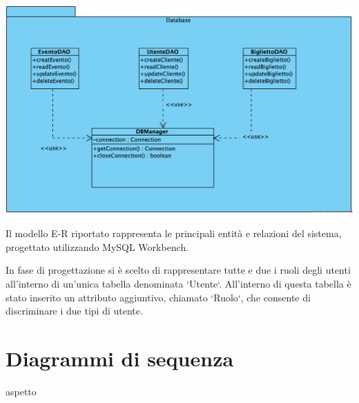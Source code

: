 \begin{center}	
	\vspace{1ex}
	\includegraphics[height=0.38\linewidth]{assets/package/database1.png}
	\vspace{1ex}
\end{center}

Il modello E-R riportato rappresenta le principali entità e relazioni del sistema, progettato utilizzando MySQL Workbench.

In fase di progettazione si è scelto di rappresentare tutte e due i ruoli degli utenti all'interno di un'unica tabella denominata `Utente`. All'interno di questa tabella è stato inserito un attributo aggiuntivo, chiamato `Ruolo`, che consente di discriminare i due tipi di utente.

\section{Diagrammi di sequenza}
aspetto
